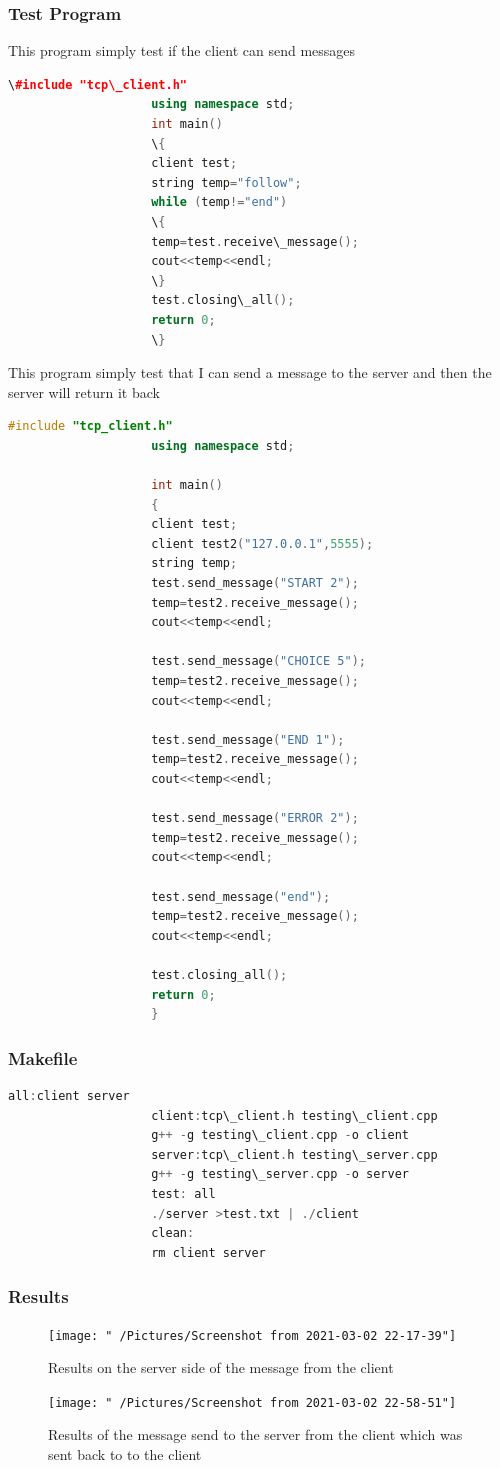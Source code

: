 \documentclass[11pt]{article}
\begin{document}
			\subsubsection{Test Program}
				This program simply test if the client can send messages
				\begin{lstlisting}[language=C++]
					\#include "tcp\_client.h"
					using namespace std;
					int main()
					\{
					client test;
					string temp="follow";
					while (temp!="end")
					\{
					temp=test.receive\_message();
					cout<<temp<<endl;
					\}
					test.closing\_all();
					return 0;
					\}
				\end{lstlisting}
				This program simply test that I can send a message to the server and then the server will return it back
				\begin{lstlisting}[language=C++]
					#include "tcp_client.h"
					using namespace std;
					
					int main()
					{
					client test;
					client test2("127.0.0.1",5555);
					string temp;
					test.send_message("START 2");
					temp=test2.receive_message();
					cout<<temp<<endl;
					
					test.send_message("CHOICE 5");
					temp=test2.receive_message();
					cout<<temp<<endl;
					
					test.send_message("END 1");
					temp=test2.receive_message();
					cout<<temp<<endl;
					
					test.send_message("ERROR 2");
					temp=test2.receive_message();
					cout<<temp<<endl;
					
					test.send_message("end");
					temp=test2.receive_message();
					cout<<temp<<endl;
					
					test.closing_all();
					return 0;
					}
				\end{lstlisting}
			\subsubsection{Makefile}
				\begin{lstlisting}[language=C++]
					all:client server
					client:tcp\_client.h testing\_client.cpp
					g++ -g testing\_client.cpp -o client
					server:tcp\_client.h testing\_server.cpp
					g++ -g testing\_server.cpp -o server
					test: all
					./server >test.txt | ./client
					clean:
					rm client server
				\end{lstlisting}
			\subsubsection{Results}
				\begin{figure}[H]
					\centering
					\texttt{[image: "~/Pictures/Screenshot from 2021-03-02 22-17-39"]}
					\caption{Results on the server side of the message from the client}
					\label{fig:screenshot-from-2021-03-02-22-17-39}
				\end{figure}
				\begin{figure}[H]
					\centering
					\texttt{[image: "~/Pictures/Screenshot from 2021-03-02 22-58-51"]}
					\caption{Results of the message send to the server from the client which was sent back to to the client}
					\label{fig:screenshot-from-2021-03-02-22-58-51}
				\end{figure}
\end{document}
